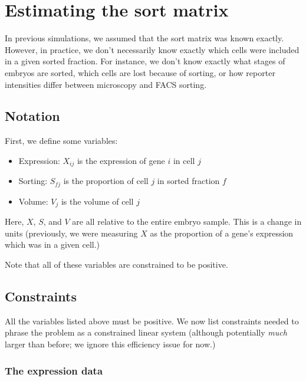 \documentclass{article}
\begin{document}
\section{Estimating the sort matrix}

In previous simulations, we assumed that the sort matrix was
known exactly. However, in practice, we don't necessarily know
exactly which cells were included in a given sorted fraction.
For instance, we don't know exactly what stages of embryos are
sorted, which cells are lost because of sorting, or how reporter
intensities differ between microscopy and FACS sorting.


\subsection{Notation}

First, we define some variables:

\begin{itemize}

\item Expression: $X_{ij}$ is the expression of gene $i$ in cell $j$

\item Sorting: $S_{fj}$ is the proportion of cell $j$ in sorted fraction $f$

\item Volume: $V_j$ is the volume of cell $j$

\end{itemize}

Here, $X$, $S$, and $V$ are all relative to the entire embryo sample.
This is a change in units (previously, we were measuring $X$ as
the proportion of a gene's expression which was in a given cell.)

Note that all of these variables are constrained to be positive.

\subsection{Constraints}

All the variables listed above must be positive.
We now list constraints needed to phrase the problem as a
constrained linear system (although potentially {\em much} larger than
before; we ignore this efficiency issue for now.)

\subsubsection{The expression data}
\end{document}
